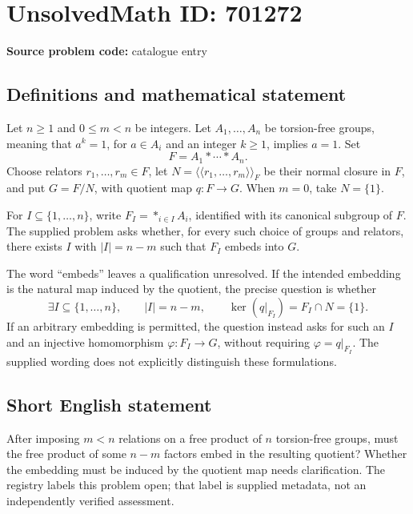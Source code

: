 \documentclass[11pt]{article}
\begin{document}
\section*{UnsolvedMath ID: 701272}
\textbf{Source problem code:} catalogue entry
\subsection{Definitions and mathematical statement}
Let \(n\geq 1\) and \(0\leq m<n\) be integers. Let \(A_1,\ldots,A_n\) be torsion-free groups, meaning that \(a^k=1\), for \(a\in A_i\) and an integer \(k\geq1\), implies \(a=1\). Set
\[
F=A_1*\cdots*A_n.
\]
Choose relators \(r_1,\ldots,r_m\in F\), let \(N=\langle\!\langle r_1,\ldots,r_m\rangle\!\rangle_F\) be their normal closure in \(F\), and put \(G=F/N\), with quotient map \(q:F\to G\). When \(m=0\), take \(N=\{1\}\).

For \(I\subseteq\{1,\ldots,n\}\), write \(F_I=*_{i\in I}A_i\), identified with its canonical subgroup of \(F\). The supplied problem asks whether, for every such choice of groups and relators, there exists \(I\) with \(|I|=n-m\) such that \(F_I\) embeds into \(G\).

The word ``embeds'' leaves a qualification unresolved. If the intended embedding is the natural map induced by the quotient, the precise question is whether
\[
\exists I\subseteq\{1,\ldots,n\},\qquad |I|=n-m,\qquad \ker(q|_{F_I})=F_I\cap N=\{1\}.
\]
If an arbitrary embedding is permitted, the question instead asks for such an \(I\) and an injective homomorphism \(\varphi:F_I\to G\), without requiring \(\varphi=q|_{F_I}\). The supplied wording does not explicitly distinguish these formulations.
\subsection{Short English statement}
After imposing \(m<n\) relations on a free product of \(n\) torsion-free groups, must the free product of some \(n-m\) factors embed in the resulting quotient? Whether the embedding must be induced by the quotient map needs clarification. The registry labels this problem open; that label is supplied metadata, not an independently verified assessment.
\end{document}
